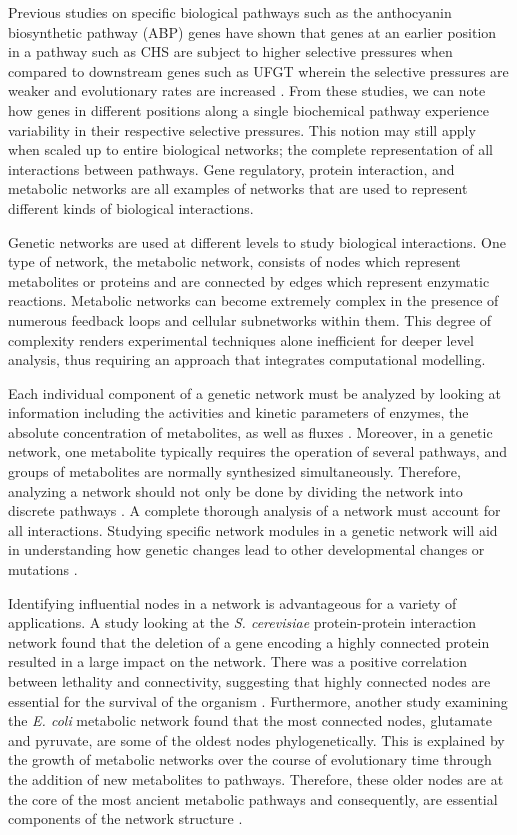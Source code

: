 \documentclass[letterpaper, 10 pt, conference]{ieeeconf}  %
\begin{document}
\setlength{\parindent}{10ex} Previous studies on specific biological pathways such as the anthocyanin biosynthetic pathway (ABP) genes have shown that genes at an earlier position in a pathway such as CHS are subject to higher selective pressures when compared to downstream genes such as UFGT wherein the selective pressures are weaker and evolutionary rates are increased \cite{rmt99}. From these studies, we can note how genes in different positions along a single biochemical pathway experience variability in their respective selective pressures. This notion may still apply when scaled up to entire biological networks; the complete representation of all interactions between pathways. Gene regulatory, protein interaction, and metabolic networks are all examples of networks that are used to represent different kinds of biological interactions. 

\setlength{\parindent}{10ex} 
Genetic networks are used at different levels to study biological interactions. One type of network, the metabolic network, consists of nodes which represent metabolites or proteins and are connected by edges which represent enzymatic reactions. Metabolic networks can become extremely complex in the presence of numerous feedback loops and cellular subnetworks within them. This degree of complexity renders experimental techniques alone inefficient for deeper level analysis, thus requiring an approach that integrates computational modelling. 


\setlength{\parindent}{10ex} Each individual component of a genetic network must be analyzed by looking at information including the activities and kinetic parameters of enzymes, the absolute concentration of metabolites, as well as fluxes \cite{Stitt428}. Moreover, in a genetic network, one metabolite typically requires the operation of several pathways, and groups of metabolites are normally synthesized simultaneously. Therefore, analyzing a network should not only be done by dividing the network into discrete pathways \cite{Stitt428}. A complete thorough analysis of a network must account for all interactions. Studying specific network modules in a genetic network will aid in understanding how genetic changes lead to other developmental changes or mutations \cite{Wilkins8590}. 

\setlength{\parindent}{10ex} Identifying influential nodes in a network is advantageous for a variety of applications. A study looking at the \textit{S. cerevisiae} protein-protein interaction network found that the deletion of a gene encoding a highly connected protein resulted in a large impact on the network. There was a positive correlation between lethality and connectivity, suggesting that highly connected nodes are essential for the survival of the organism \cite{jmbo01}. Furthermore, another study examining the \textit{E. coli} metabolic network found that the most connected nodes, glutamate and pyruvate, are some of the oldest nodes phylogenetically. This is explained by the growth of metabolic networks over the course of evolutionary time through the addition of new metabolites to pathways. Therefore, these older nodes are at the core of the most ancient metabolic pathways and consequently, are essential components of the network structure \cite{fw00}.
\end{document}

